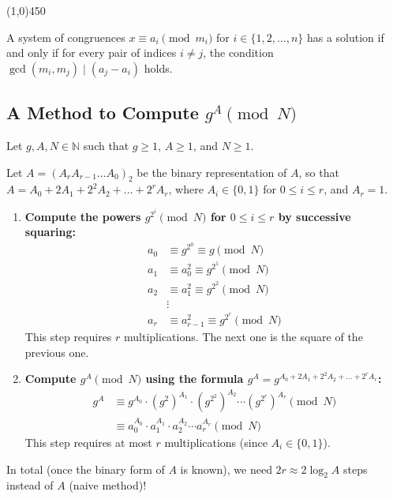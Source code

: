 \begin{center}
    \vspace{10pt}
    \line(1,0){450}
    \vspace{25pt}
\end{center}

\begin{proposition}
A system of congruences $x \equiv a_i \pmod{m_i}$ for $i \in \{1, 2, \ldots, n\}$ has a solution if and only if for every pair of indices $i \neq j$, the condition $\gcd(m_i, m_j) \mid (a_j - a_i)$ holds.
\end{proposition}

\bigskip

\subsection*{A Method to Compute $g^A \pmod{N}$}

\begin{algorithm}
\par
Let $g, A, N \in \mathbb{N}$ such that $g \ge 1$, $A \ge 1$, and $N \ge 1$.
\par
Let $A = (A_r A_{r-1} \dots A_0)_2$ be the binary representation of $A$, so that $A = A_0 + 2A_1 + 2^2A_2 + \dots + 2^rA_r$, where $A_i \in \{0, 1\}$ for $0 \le i \le r$, and $A_r = 1$.

\begin{enumerate}
    \item \textbf{Compute the powers $g^{2^i} \pmod{N}$ for $0 \le i \le r$ by successive squaring:}
    \begin{align*}
        a_0 &\equiv g^{2^0} \equiv g \pmod{N} \\
        a_1 &\equiv a_0^2 \equiv g^{2^1} \pmod{N} \\
        a_2 &\equiv a_1^2 \equiv g^{2^2} \pmod{N} \\
        &\vdots \\
        a_{r} &\equiv a_{r-1}^2 \equiv g^{2^r} \pmod{N}
    \end{align*}
    This step requires $r$ multiplications. The next one is the square of the previous one.

    \item \textbf{Compute $g^A \pmod{N}$ using the formula $g^A = g^{A_0 + 2A_1 + 2^2A_2 + \dots + 2^rA_r}$:}
    \begin{align*}
        g^A &\equiv g^{A_0} \cdot (g^2)^{A_1} \cdot (g^{2^2})^{A_2} \cdots (g^{2^r})^{A_r} \pmod{N} \\
        &\equiv a_0^{A_0} \cdot a_1^{A_1} \cdot a_2^{A_2} \cdots a_r^{A_r} \pmod{N}
    \end{align*}
    This step requires at most $r$ multiplications (since $A_i \in \{0, 1\}$).
\end{enumerate}
In total (once the binary form of $A$ is known), we need $2r \approx 2 \log_2 A$ steps instead of $A$ (naive method)!
\end{algorithm}

